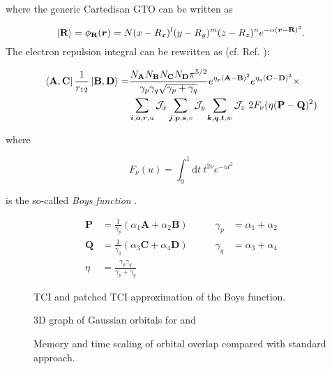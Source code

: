 where the generic Cartedisan GTO can be written as

\begin{equation}
    \ket{\textbf{R}} = \phi_\textbf{R}(\bm{r}) = N (x - R_x)^l (y - R_y)^m (z - R_z)^n e^{-\alpha (\bm{r} - \textbf{R})^2}.
\end{equation}
The electron repulsion integral can be rewritten as (cf. Ref. \cite{Petersson2010}): 

\begin{align}
    \bra{\textbf{A}, \textbf{C}}\frac{1}{r_{12}}\ket{\textbf{B}, \textbf{D}} =& \frac{N_\textbf{A}N_\textbf{B}N_\textbf{C}N_\textbf{D} \pi^{5/2}}{\gamma_p\gamma_q\sqrt{\gamma_p + \gamma_q}} e^{\eta_p(\textbf{A} - \textbf{B})^2} e^{\eta_q(\textbf{C} - \textbf{D})^2} \times \\
    \nonumber &\sum_{\bm{i},\bm{o},\bm{r},u}\mathcal{J}_x \sum_{\bm{j},\bm{p},\bm{s},v} \mathcal{J}_y \sum_{\bm{k},\bm{q},\bm{t},w} \mathcal{J}_z\ 2F_\nu (\eta (\textbf{P} - \textbf{Q})^2)
\end{align}

where

\begin{equation} 
    F_\nu(u) = \int_{0}^{1} \text{d}t\ t^{2\nu} e ^{-ut^2}
\end{equation}

is the so-called \textit{Boys function} \cite{Boys1950}.

    
\begin{equation}
    \begin{alignedat}{5}      
      \textbf{P} &= \frac{1}{\gamma_p}(\alpha_1 \textbf{A} + \alpha_2 \textbf{B}) &\qquad \gamma_p &= \alpha_1 + \alpha_2 \\[6pt]
      \textbf{Q} &= \frac{1}{\gamma_q}(\alpha_3 \textbf{C} + \alpha_4 \textbf{D}) &\qquad \gamma_q &= \alpha_3 + \alpha_4 \\[6pt]
      \eta &= \frac{\gamma_p\gamma_q}{\gamma_p + \gamma_q}
    \end{alignedat}
\end{equation}
    

\begin{figure}[ht!]
    \caption{TCI and patched TCI approximation of the Boys function.}
\end{figure}

\begin{figure}[ht!]
    \caption{3D graph of Gaussian orbitals for  and }
\end{figure}

\begin{figure}[ht!]
    \caption{Memory and time scaling of orbital overlap compared with standard approach. }
\end{figure}


